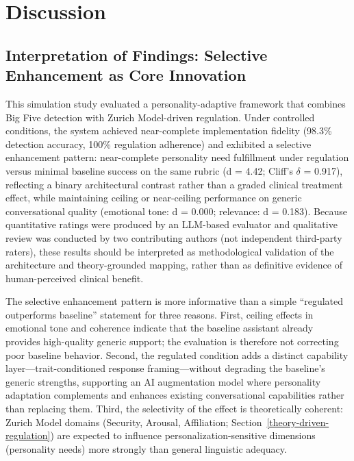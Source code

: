 \section{Discussion}\label{discussion}

\subsection{Interpretation of Findings: Selective Enhancement as Core Innovation}\label{interpretation-of-findings-selective-enhancement-as-core-innovation}

This simulation study evaluated a personality-adaptive framework that combines Big Five detection with Zurich Model-driven regulation. Under controlled conditions, the system achieved near-complete implementation fidelity (98.3\% detection accuracy, 100\% regulation adherence) and exhibited a selective enhancement pattern: near-complete personality need fulfillment under regulation versus minimal baseline success on the same rubric (d = 4.42; Cliff's \(\delta\) = 0.917), reflecting a binary architectural contrast rather than a graded clinical treatment effect, while maintaining ceiling or near-ceiling performance on generic conversational quality (emotional tone: d = 0.000; relevance: d = 0.183). Because quantitative ratings were produced by an LLM-based evaluator and qualitative review was conducted by two contributing authors (not independent third-party raters), these results should be interpreted as methodological validation of the architecture and theory-grounded mapping, rather than as definitive evidence of human-perceived clinical benefit.

The selective enhancement pattern is more informative than a simple ``regulated outperforms baseline'' statement for three reasons. First, ceiling effects in emotional tone and coherence indicate that the baseline assistant already provides high-quality generic support; the evaluation is therefore not correcting poor baseline behavior. Second, the regulated condition adds a distinct capability layer---trait-conditioned response framing---without degrading the baseline's generic strengths, supporting an AI augmentation model where personality adaptation complements and enhances existing conversational capabilities rather than replacing them. Third, the selectivity of the effect is theoretically coherent: Zurich Model domains (Security, Arousal, Affiliation; Section~\ref{theory-driven-regulation}) are expected to influence personalization-sensitive dimensions (personality needs) more strongly than general linguistic adequacy.

